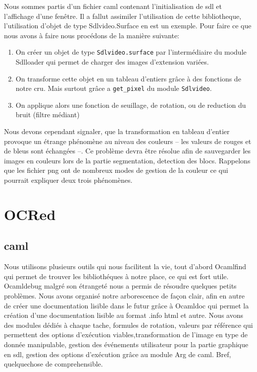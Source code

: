 \documentclass[]{report}
\begin{document}
        \label{sec:Ocamlsdl}
        Nous sommes partis d'un fichier caml contenant l'initialisation de sdl et l'affichage d'une fenêtre. Il a fallut assimiler
        l'utilisation de cette bibliotheque, l'utilisation d'objet de type Sdlvideo.Surface en est un exemple. Pour faire ce que
        nous avons à faire nous procédons de la manière suivante:
        \begin{enumerate}
          \item On créer un objet de type \verb!Sdlvideo.surface! par l'intermédiaire du module Sdlloader qui permet de charger des
            images d'extension variées.
          \item On transforme cette objet en un tableau d'entiers grâce à des fonctions de notre cru. Mais surtout grâce a \verb!get_pixel! du module \verb!Sdlvideo!.
          \item On applique alors une fonction de seuillage, de rotation, ou de reduction du bruit (filtre médiant)
        \end{enumerate}

        Nous devons cependant signaler, que la transformation en tableau d'entier provoque un étrange phénomène au niveau des
        couleurs -- les valeurs de rouges et de bleus sont échangées --. Ce problème devra être résolue afin de sauvegarder
        les images en couleurs lors de la partie segmentation, detection des blocs. Rappelons que les fichier png ont de
        nombreux modes de gestion de la couleur ce qui pourrait expliquer deux trois phénomènes.

        \section{OCRed}
        \subsection{caml}
         Nous utilisons plusieurs outils qui nous facilitent la vie, tout d'abord Ocamlfind qui permet de trouver les bibliothéques à notre place, ce qui est fort utile. Ocamldebug malgré son étrangeté nous a permis de résoudre quelques petits problèmes.
         Nous avons organisé notre arborescence de façon clair, afin en autre de créer une documentation lisible dans le futur grâce à Ocamldoc qui permet la création d'une documentation lisible au format .info html et autre.
         Nous avons des modules dédiés à chaque tache, formules de rotation, valeurs par référence qui permettent des options d'exécution viables,transformation de l'image en type de donnée manipulable, gestion des événements utilisateur pour la partie graphique en sdl, gestion des options d'exécution grâce au module Arg de caml.
         Bref, quelquechose de comprehensible.
\end{document}
